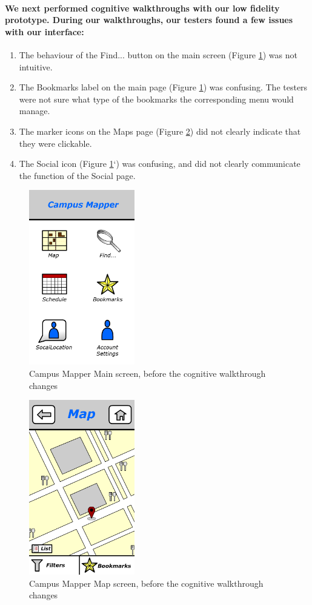 \documentclass{report}
\begin{document}
    \paragraph{We next performed cognitive walkthroughs with our low fidelity
    prototype. During our walkthroughs, our testers found a few issues with our
    interface:}
    \begin{enumerate}
    \item The behaviour of the Find... button on the main screen (Figure
    \ref{fig:digital-dashboard}) was not intuitive.
    \item The Bookmarks label on the main page (Figure \ref{fig:digital-dashboard}) was
    confusing. The testers were not sure what type of the bookmarks the
    corresponding menu would manage.
    \item The marker icons on the Maps page (Figure \ref{fig:digital-map}) did not clearly
    indicate that they were clickable.
    \item The Social icon (Figure \ref{fig:digital-dashboard}`) was confusing, and did not
    clearly communicate the function of the Social page.
    \end{enumerate}
    \begin{figure}
        \centering
            \includegraphics[height=3in]{img/dashboard.png}
        \caption{Campus Mapper Main screen, before the cognitive walkthrough changes} 
        \label{fig:digital-dashboard} 
    \end{figure}
    \begin{figure}
        \centering
            \includegraphics[height=3in]{img/map_resturants.png} 
        \caption{Campus Mapper Map screen, before the cognitive walkthrough changes}
        \label{fig:digital-map}
    \end{figure}
\end{document}
